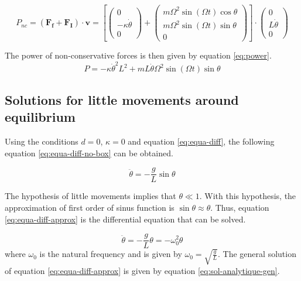 \documentclass[a4paper,12pt,twoside]{article}
\begin{document}
\begin{equation*}
	P_{nc}= (\mathbf{F_f} + \mathbf{F_I})\cdot \mathbf{v} =
	\left[
	\begin{pmatrix}
		0 \\
		-\kappa \dot{\theta} \\
		0
	\end{pmatrix}
	+ \begin{pmatrix}
		m \Omega^2 \sin(\Omega t) \cos\theta \\
		m \Omega^2 \sin(\Omega t) \sin\theta \\
		0
	\end{pmatrix}
	\right]
	\cdot
	\begin{pmatrix}
		0 \\
		L\dot{\theta} \\
		0
	\end{pmatrix}
\end{equation*}

The power of non-conservative forces is then given by equation \ref{eq:power}.
\begin{equation}
	P = -\kappa\dot{\theta}^2 L^2 + mL\dot{\theta} \Omega^2 \sin(\Omega t) \sin\theta
	\label{eq:power}
\end{equation}


\subsection{Solutions for little movements around equilibrium}\label{sec:sol-analytique}
Using the conditions $d=\num{0}$, $\kappa=\num{0}$ and equation \ref{eq:equa-diff}, the following equation \ref{eq:equa-diff-no-box} can be obtained.

\begin{equation}
	\ddot{\theta} = -\frac{g}{L}\sin\theta
	\label{eq:equa-diff-no-box}
\end{equation}

The hypothesis of little movements implies that $\theta \ll 1$.
With this hypothesis, the approximation of first order of sinus function is $\sin\theta \approx \theta$.
Thus, equation \ref{eq:equa-diff-approx} is the differential equation that can be solved.

\begin{equation}
	\ddot{\theta} = -\frac{g}{L}\theta = -\omega_0^2\theta
	\label{eq:equa-diff-approx}
\end{equation}
where $\omega_0$ is the natural frequency and is given by $\omega_0 = \sqrt{\frac{g}{L}}$.
The general solution of equation \ref{eq:equa-diff-approx} is given by equation \ref{eq:sol-analytique-gen}.
\end{document}
